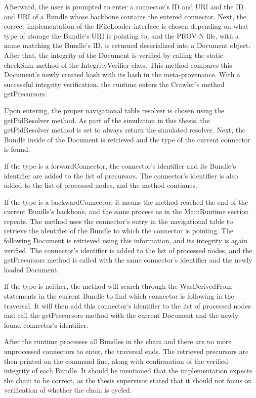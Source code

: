 \documentclass[
  digital,     %
  oneside,     %
  nosansbold,  %
  nocolorbold, %
  lof,         %
  lot,         %
]{fithesis4}
\begin{document}
Afterward, the user is prompted to enter a connector's ID and URI and the ID and URI of a Bundle whose backbone contains the entered connector. Next, the correct implementation of the IFileLoader interface is chosen depending on what type of storage the Bundle's URI is pointing to, and the PROV-N file, with a name matching the Bundle's ID, is returned deserialized into a Document object. After that, the integrity of the Document is verified by calling the static checkSum method of the IntegrityVerifier class. This method compares this Document's newly created hash with its hash in the meta-provenance. With a successful integrity verification, the runtime enters the Crawler's method getPrecursors.

Upon entering, the proper navigational table resolver is chosen using the getPidResolver method. As part of the simulation in this thesis, the getPidResolver method is set to always return the simulated resolver. Next, the Bundle inside of the Document is retrieved and the type of the current connector is found. 

If the type is a forwardConnector, the connector's identifier and its Bundle's identifier are added to the list of precursors. The connector's identifier is also added to the list of processed nodes, and the method continues. 

If the type is a backwardConnector, it means the method reached the end of the current Bundle's backbone, and the same process as in the MainRuntime section repeats. The method uses the connector's entry in the navigational table to retrieve the identifier of the Bundle to which the connector is pointing. The following Document is retrieved using this information, and its integrity is again verified. The connector's identifier is added to the list of processed nodes, and the getPrecursors method is called with the same connector's identifier and the newly loaded Document. 

If the type is neither, the method will search through the WasDerivedFrom statements in the current Bundle to find which connector is following in the traversal. It will then add this connector's identifier to the list of processed nodes and call the getPrecursors method with the current Document and the newly found connector's identifier. 

After the runtime processes all Bundles in the chain and there are no more unprocessed connectors to enter, the traversal ends. The retrieved precursors are then printed on the command line, along with confirmation of the verified integrity of each Bundle. It should be mentioned that the implementation expects the chain to be correct, as the thesis supervisor stated that it should not focus on verification of whether the chain is cycled.
\end{document}

